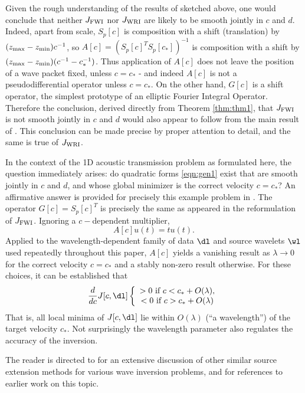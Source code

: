 Given the rough understanding of the results of \cite{StolkSymes:03}
sketched above, one would conclude that neither $J_{\rm FWI}$ nor
$J_{\rm WRI}$ are likely to be smooth jointly in $c$ and $d$. Indeed,
apart from scale, $S_p[c]$ is composition with a shift (translation)
by $(z_{\rm max}-z_{\rm min})c^{-1}$, so
$A[c]=(S_p[c]^T S_p[c_*])^{-1}$ is composition with a shift by
$(z_{\rm max}-z_{\rm min})(c^{-1}-c_*^{-1})$. Thus application of
$A[c]$ does not leave the position of a wave packet fixed, unless
$c=c_*$ - and indeed $A[c]$ is not a pseudodifferential operator
unless $c=c_*$. On the other hand, $G[c]$ is a shift operator, the
simplest prototype of an elliptic Fourier Integral Operator. Therefore
the conclusion, derived directly from Theorem \ref{thm:thm1}, that
$J_{\rm FWI}$ is not smooth jointly in $c$ and $d$ would also appear
to follow from the main result of \cite[]{StolkSymes:03}. This
conclusion can be made precise by proper attention to detail, and the
same is true of $J_{\rm WRI}$.

In the context of the 1D acoustic transmission problem as formulated
here, the question immediately arises: do quadratic forms \ref{eqn:gen1}
exist that are smooth jointly in $c$ and $d$, and whose global
minimizer is the correct velocity $c=c_*$? An affirmative answer is
provided for precisely this example problem in
\cite[]{wwsorcas:19-02}. The operator $G[c]=S_p[c]^T$ is precisely the
same as appeared in the reformulation of $J_{\rm FWI}$. Ignoring a
$c-$dependent multiplier,
\[
  A[c]u(t) = tu(t).
\]
Applied to the wavelength-dependent family of data $\dl$ and source
wavelets $\wl$ used repeatedly throughout this paper, $A[c]$ yields a
vanishing result as $\lambda \rightarrow 0$ for the correct velocity
$c=c_*$ and a stably non-zero result otherwise. For these choices, it
can be established that
\[
  \frac{d}{dc}J[c,\dl]
  \left\{\begin{array}{c}
           > 0 \mbox{ if }c<c_*+O(\lambda),\\
           < 0 \mbox{ if }c>c_*+O(\lambda)
         \end{array}
       \right.
     \]
That is, all local minima of $J[c,\dl]$ lie within $O(\lambda)$ (``a
wavelength'') of the target velocity $c_*$. Not surprisingly the
wavelength parameter also regulates the accuracy of the inversion.

The reader is directed to \cite[]{HuangNammourSymesDollizal:SEG19} for
an extensive discussion of other similar source extension methods for
various wave inversion problems, and for
references to earlier work on this topic.

